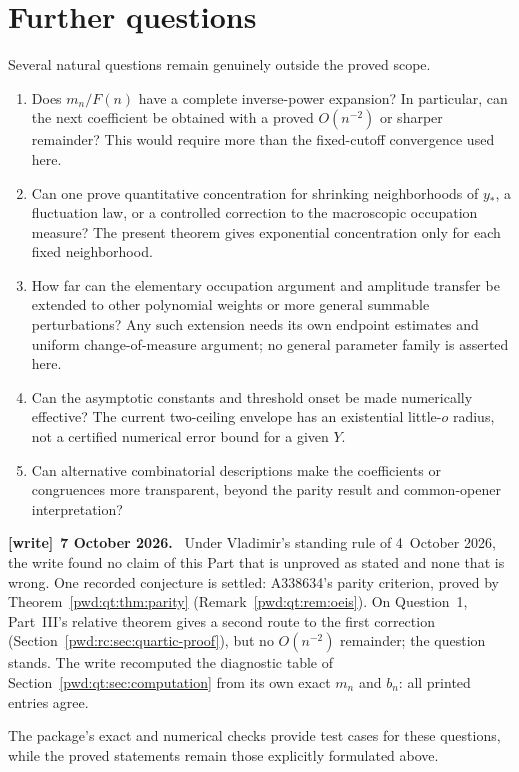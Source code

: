 \documentclass[11pt,letterpaper]{article}
\numberwithin{equation}{section}
\theoremstyle{remark}\newtheorem{remark}[theorem]{Remark}
\newenvironment{writenote}[1][]{\par\smallskip\begingroup\small
 \noindent\textbf{[write]}\if\relax\detokenize{#1}\relax\else~\textbf{#1.}\fi\ }%
 {\par\endgroup\smallskip}
\begin{document}
\section{Further questions}\label{pwd:qt:sec:questions}
Several natural questions remain genuinely outside the proved scope.
\begin{enumerate}[leftmargin=1.8em]
 \item Does $m_n/F(n)$ have a complete inverse-power expansion? In particular, can the next coefficient be obtained with a proved $O(n^{-2})$ or sharper remainder? This would require more than the fixed-cutoff convergence used here.
 \item Can one prove quantitative concentration for shrinking neighborhoods of $y_*$, a fluctuation law, or a controlled correction to the macroscopic occupation measure? The present theorem gives exponential concentration only for each fixed neighborhood.
 \item How far can the elementary occupation argument and amplitude transfer be extended to other polynomial weights or more general summable perturbations? Any such extension needs its own endpoint estimates and uniform change-of-measure argument; no general parameter family is asserted here.
 \item Can the asymptotic constants and threshold onset be made numerically effective? The current two-ceiling envelope has an existential little-$o$ radius, not a certified numerical error bound for a given $Y$.
 \item Can alternative combinatorial descriptions make the coefficients or congruences more transparent, beyond the parity result and common-opener interpretation?
\end{enumerate}
\begin{writenote}[7 October 2026]
Under Vladimir's standing rule of 4~October 2026, the write found no claim of
this Part that is unproved as stated and none that is wrong. One recorded
conjecture is settled: A338634's parity criterion, proved by
Theorem~\ref{pwd:qt:thm:parity} (Remark~\ref{pwd:qt:rem:oeis}). On Question~1,
Part~III's relative theorem gives a second route to the first correction
(Section~\ref{pwd:rc:sec:quartic-proof}), but no $O(n^{-2})$ remainder; the
question stands. The write recomputed the diagnostic table of
Section~\ref{pwd:qt:sec:computation} from its own exact $m_n$ and $b_n$: all
printed entries agree.
\end{writenote}
The package's exact and numerical checks provide test cases for these questions, while the proved statements remain those explicitly formulated above.
\end{document}
